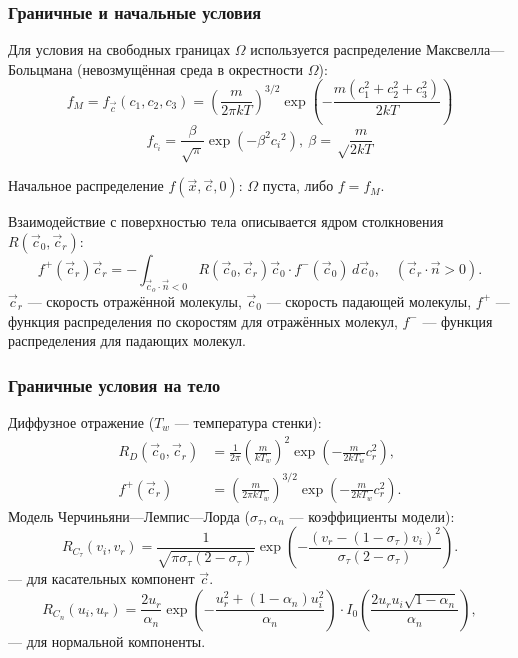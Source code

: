 \documentclass[onlymath]{beamer}
\newcommand\dom{\Omega}
\begin{document}
\begin{frame}
  \frametitle{Граничные и начальные условия}
  Для условия на свободных границах $\dom$ используется распределение
  Максвелла—Больцмана (невозмущённая среда в окрестности $\dom$):
  \begin{equation*}
    \label{eq:maxwell-boltzmann}
    f_M = f_{\vec{c}}(c_1, c_2, c_3) = \left(\frac{m}{2\pi k T}\right)^{3/2}
    \exp\left(-\frac{m(c_1^2 + c_2^2 +c_3^2)}{2kT}\right)
  \end{equation*}
  \begin{equation*}
    \label{eq:maxwell-boltzmann-component}
    f_{c_i} = \frac{\beta}{\sqrt{\pi}}\exp(-\beta^2{c_i}^2),\:  \beta = \sqrt\frac{m}{2kT}
  \end{equation*}
  
  Начальное распределение $f(\vec{x}, \vec{c}, 0)$: $\dom$ пуста, либо
  $f = f_M$.
  
  Взаимодействие с поверхностью тела описывается ядром столкновения
  $R(\vec{c}_0, \vec{c}_r)$:
  \begin{equation*}
    f^+(\vec{c}_r) \vec{c}_r = -\int_{\vec{c}_o \cdot
      \vec{n} < 0}{R(\vec{c}_0, \vec{c}_r)}\vec{c}_0 \cdot
    f^-(\vec{c}_0)\,d\vec{c}_0,\quad(\vec{c}_r\cdot\vec{n}>0).
  \end{equation*}
  $\vec{c}_r$ — скорость отражённой молекулы, $\vec{c}_0$ — скорость
  падающей молекулы, $f^+$ — функция распределения по скоростям для
  отражённых молекул, $f^-$ — функция распределения для падающих
  молекул.
\end{frame}

\begin{frame}
  \frametitle{Граничные условия на тело}
  Диффузное отражение ($T_w$ — температура стенки):
  \begin{equation*}
    \begin{aligned}
      R_D(\vec{c}_0, \vec{c}_r) &=
      \frac{1}{2\pi}\left(\frac{m}{kT_w}\right)^2\exp\left(-\frac{m}{2kT_w}c^2_r\right),\\
      f^+(\vec{c}_r) &= \left(\frac{m}{2\pi k
          T_w}\right)^{3/2}\exp\left(-\frac{m}{2kT_w}c^2_r\right).
    \end{aligned}
  \end{equation*}
  Модель Черчиньяни—Лемпис—Лорда ($\sigma_{\tau}, \alpha_n$ —
  коэффициенты модели):
  \begin{equation*}
    \label{eq:cll-tau}
    R_{C_{\tau}}(v_i, v_r) = \frac{1}{\sqrt{\pi \sigma_{\tau} (2-\sigma_{\tau})}}
    \exp{\left(-\frac{(v_r-(1-\sigma_{\tau})v_i)^2}{\sigma_{\tau}(2-\sigma_{\tau})}\right)}.
  \end{equation*} — для касательных компонент $\vec{c}$.
  \begin{equation*}
    R_{C_{n}}(u_i, u_r) = \frac{2 u_r}{\alpha_n}
    \exp{\left(-\frac{u^2_r+(1-\alpha_n)u^2_i}{\alpha_n}\right)} \cdot
    I_0\left(\frac{2 u_r u_i \sqrt{1-\alpha_n}}{\alpha_n}\right),
  \end{equation*} — для нормальной компоненты.
\end{frame}
\end{document}
